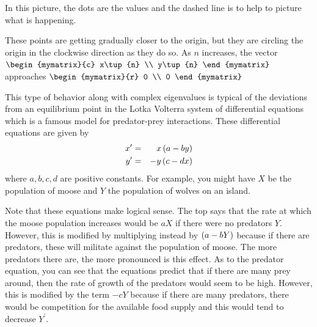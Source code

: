 \begin{solution}
In this picture, the dots are the values and the dashed line is to help to
picture what is happening.

These points are getting gradually closer to the origin, but they are
circling the origin in the clockwise direction as they do so. As $n$ increases,
the vector  $\begin{mymatrix}{c}
x\tup{n} \\
y\tup{n}
\end{mymatrix}$ approaches $ \begin{mymatrix}{r}
0 \\
0
\end{mymatrix}$
\end{solution}

This type of behavior along with complex eigenvalues is typical of the
deviations from an equilibrium point in the Lotka Volterra system of
differential equations which is a famous model for predator-prey
interactions. These differential equations are given by
\begin{eqnarray*}
x^{\prime } &=&x\left(a-by\right) \\
y^{\prime } &=&-y\left(c-dx\right)
\end{eqnarray*}
where $a,b,c,d$ are positive constants. For example, you might have $X$ be
the population of moose and $Y$ the population of wolves on an island.

Note that these equations make logical sense. The top says that the rate at which
the moose population increases would be $aX$ if there were no predators $Y$.
However, this is modified by multiplying instead by $\left(a-bY\right) $
because if there are predators, these will militate against the population
of moose.  The more predators there
are, the more pronounced is this effect. As to the predator equation, you
can see that the equations predict that if there are many prey around, then
the rate of growth of the predators would seem to be high. However, this is
modified by the term $-cY$ because if there are many predators, there would
be competition for the available food supply and this would tend to decrease
$Y^{\prime }.$

